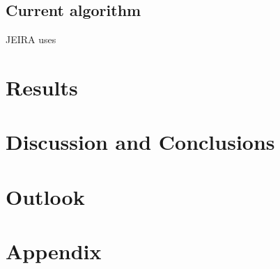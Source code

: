 \documentclass[10pt,a4paper]{article}
\begin{document}






\subsection{Current algorithm}
JEIRA uses




\section{Results}


\section{Discussion and Conclusions}


\section{Outlook}

\section{Appendix}


\newpage


\end{document}
